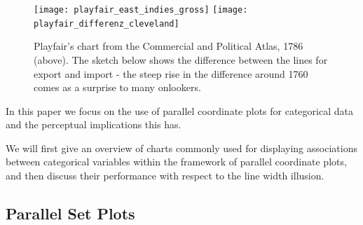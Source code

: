 
\begin{figure}
\texttt{[image: playfair\_east\_indies\_gross]}
\texttt{[image: playfair\_differenz\_cleveland]}
\caption{Playfair's chart from the Commercial and Political Atlas, 1786 (above). The sketch below shows  the difference between the lines for export and import - the steep rise in the difference around 1760  comes as a surprise to many onlookers.  }
\label{playfair}
\end{figure}

%
%

In this paper we focus on the use of parallel coordinate plots \citep{pcp:1885, inselberg:1985, wegman:1990} for categorical data and the perceptual implications this has.

We will first give an overview of  charts commonly used for displaying associations between categorical variables within the framework of parallel coordinate plots, and then discuss their performance with respect to the line width illusion.


\subsection{Parallel Set Plots}


